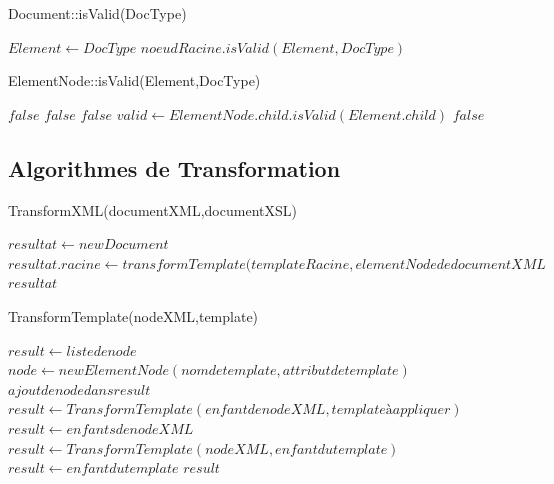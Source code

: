 \begin{algorithm}
\caption{Document::isValid(DocType)}
\begin{algorithmic}
\STATE $Element \leftarrow DocType$
\RETURN $noeudRacine.isValid(Element,DocType)$
\end{algorithmic}
\end{algorithm}

\begin{algorithm}
\caption{ElementNode::isValid(Element,DocType)}
\begin{algorithmic}
\RETURN $false$
\ENDIF
{}
\RETURN $false$
\ENDIF
\ENDFOR
{}
\RETURN $false$
\ENDIF
\STATE $valid \leftarrow ElementNode.child.isValid(Element.child)$
\RETURN $false$
\ENDIF
\ENDFOR
\end{algorithmic}
\end{algorithm}

\subsection{Algorithmes de Transformation}

\begin{algorithm}
\caption{TransformXML(documentXML,documentXSL)}
\begin{algorithmic}
\STATE $resultat \leftarrow new Document$
\STATE $resultat.racine \leftarrow transformTemplate(templateRacine,elementNode de documentXML$
\ENDIF
\ENDFOR
\RETURN $resultat$
\end{algorithmic}
\end{algorithm}

\begin{algorithm}
\caption{TransformTemplate(nodeXML,template)}
\begin{algorithmic}
\STATE $result \leftarrow liste de node$
\STATE $node \leftarrow new ElementNode(nom de template,attribut de template)$
\STATE $ajout de node dans result$
\ENDIF
{}
\STATE $result \leftarrow TransformTemplate(enfant de nodeXML,template à appliquer)$
\ENDIF
{}
\STATE $result \leftarrow enfants de nodeXML$
\ENDIF
\ELSE
\STATE $result \leftarrow TransformTemplate(nodeXML,enfant du template)$
\ENDIF
\ELSE
\STATE $result \leftarrow enfant du template$
\ENDIF
\ENDFOR
\RETURN $result$
\end{algorithmic}
\end{algorithm}

